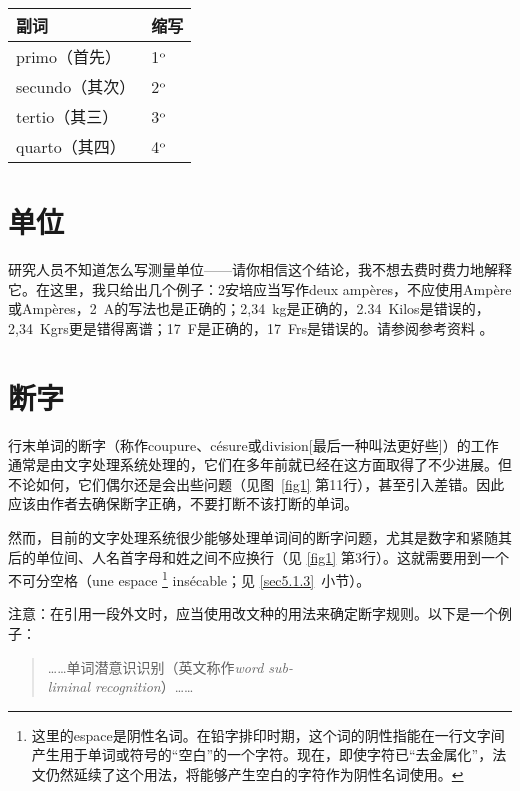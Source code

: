\begin{center}
    \begin{tabular}{|l|l|}
        \hline
        副词 & 缩写\\
        \hline
        primo（首先） & 1$^{\rm o}$ \\
        secundo（其次） & 2$^{\rm o}$ \\
        tertio（其三） & 3$^{\rm o}$ \\
        quarto（其四） & 4$^{\rm o}$ \\
        \hline
    \end{tabular}
    
\end{center}

\section{单位}

研究人员不知道怎么写测量单位——请你相信这个结论，我不想去费时费力地解释它。在这里，我只给出几个例子：2安培应当写作deux ampères，不应使用Ampère或Ampères，2~A的写法也是正确的；2,34~kg是正确的，2.34~Kilos是错误的，2,34~Kgrs更是错得离谱；17~F是正确的，17~Frs是错误的。请参阅参考资料%
。

\section{断字}

行末单词的断字（称作coupure、césure或division[最后一种叫法更好些]）的工作通常是由文字处理系统处理的，它们在多年前就已经在这方面取得了不少进展。但不论如何，它们偶尔还是会出些问题（见图~\ref{fig1} 第11行），甚至引入差错。因此应该由作者去确保断字正确，不要打断不该打断的单词。

然而，目前的文字处理系统很少能够处理单词间的断字问题，尤其是数字和紧随其后的单位间、人名首字母和姓之间不应换行（见 \ref{fig1} 第3行）。这就需要用到一个不可分空格（une espace
    \footnote{这里的espace是阴性名词。在铅字排印时期，这个词的阴性指能在一行文字间产生用于单词或符号的``空白''的一个字符。现在，即使字符已``去金属化''，法文仍然延续了这个用法，将能够产生空白的字符作为阴性名词使用。}
insécable；见 \ref{sec5.1.3}~小节）。

注意：在引用一段外文时，应当使用改文种的用法来确定断字规则。以下是一个例子：

\begin{quote}
    ……单词潜意识识别（英文称作\emph{word sub-\\
    liminal recognition}）……
\end{quote}

